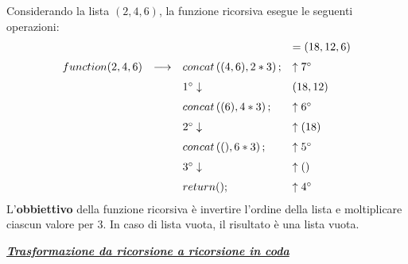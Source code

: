 \documentclass[a4paper]{article}
\begin{document}
	\noindent
	Considerando la lista $\left(2,4,6\right)$, la funzione ricorsiva esegue le seguenti operazioni:
	\begin{equation*}
		\begin{array}{llll}
			&&& = (18,12,6)\\ [.6em]
			function(2,4,6) &\longrightarrow& concat\left((4,6), 2*3\right);& \uparrow 7\degree\\ [.6em]
			&& 1\degree\downarrow& (18, 12) \\ [.6em]
			&& concat\left((6), 4*3\right);& \uparrow 6\degree \\ [.6em]
			&& 2\degree\downarrow& \uparrow (18) \\ [.6em]
			&& concat\left((), 6*3\right);& \uparrow 5\degree \\ [.6em]
			&& 3\degree\downarrow& \uparrow() \\ [.6em]
			&& return();& \uparrow 4\degree
		\end{array}
	\end{equation*}
	L'\textbf{obbiettivo} della funzione ricorsiva è invertire l'ordine della lista e moltiplicare ciascun valore per 3. In caso di lista vuota, il risultato è una lista vuota.
	
	\begin{center}
		\textbf{\emph{\underline{Trasformazione da ricorsione a ricorsione in coda}}}
	\end{center}
	
\end{document}
